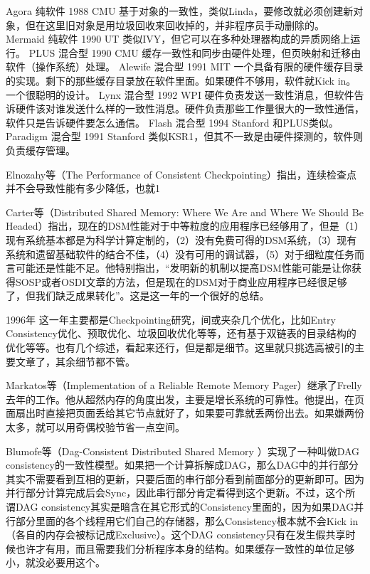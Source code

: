 \documentclass[a4paper,twoside]{scrbook}
\begin{document}
Agora	纯软件	1988	CMU	基于对象的一致性，类似Linda，要修改就必须创建新对象，但在这里旧对象是用垃圾回收来回收掉的，并非程序员手动删除的。
Mermaid	纯软件	1990	UT	类似IVY，但它可以在多种处理器构成的异质网络上运行。
PLUS	混合型	1990	CMU	缓存一致性和同步由硬件处理，但页映射和迁移由软件（操作系统）处理。
Alewife	混合型	1991	MIT	一个具备有限的硬件缓存目录的实现。剩下的那些缓存目录放在软件里面。如果硬件不够用，软件就Kick in。一个很聪明的设计。
Lynx	混合型	1992	WPI	硬件负责发送一致性消息，但软件告诉硬件该对谁发送什么样的一致性消息。硬件负责那些工作量很大的一致性通信，软件只是告诉硬件要怎么通信。
Flash	混合型	1994	Stanford	和PLUS类似。
Paradigm	混合型	1991	Stanford	类似KSR1，但其不一致是由硬件探测的，软件则负责缓存管理。

Elnozahy等（The Performance of Consistent Checkpointing）指出，连续检查点并不会导致性能有多少降低，也就1%

Carter等（Distributed Shared Memory: Where We Are and Where We Should Be Headed）指出，现在的DSM性能对于中等粒度的应用程序已经够用了，但是（1）现有系统基本都是为科学计算定制的，（2）没有免费可得的DSM系统，（3）现有系统和遗留基础软件的结合不佳，（4）没有可用的调试器，（5）对于细粒度任务而言可能还是性能不足。他特别指出，“发明新的机制以提高DSM性能可能是让你获得SOSP或者OSDI文章的方法，但是现在的DSM对于商业应用程序已经很足够了，但我们缺乏成果转化”。这是这一年的一个很好的总结。



1996年
这一年主要都是Checkpointing研究，间或夹杂几个优化，比如Entry Consistency优化、预取优化、垃圾回收优化等等，还有基于双链表的目录结构的优化等等。也有几个综述，看起来还行，但是都是细节。这里就只挑选高被引的主要文章了，其余细节都不管。

Markatos等（Implementation of a Reliable Remote Memory Pager）继承了Frelly去年的工作。他从超然内存的角度出发，主要是增长系统的可靠性。他提出，在页面扇出时直接把页面丢给其它节点就好了，如果要可靠就丢两份出去。如果嫌两份太多，就可以用奇偶校验节省一点空间。

Blumofe等（Dag-Consistent Distributed Shared Memory ）实现了一种叫做DAG consistency的一致性模型。如果把一个计算拆解成DAG，那么DAG中的并行部分其实不需要看到互相的更新，只要后面的串行部分看到前面部分的更新即可。因为并行部分计算完成后会Sync，因此串行部分肯定看得到这个更新。不过，这个所谓DAG consistency其实是暗含在其它形式的Consistency里面的，因为如果DAG并行部分里面的各个线程用它们自己的存储器，那么Consistency根本就不会Kick in（各自的内存会被标记成Exclusive）。这个DAG consistency只有在发生假共享时候也许才有用，而且需要我们分析程序本身的结构。如果缓存一致性的单位足够小，就没必要用这个。
\end{document}
